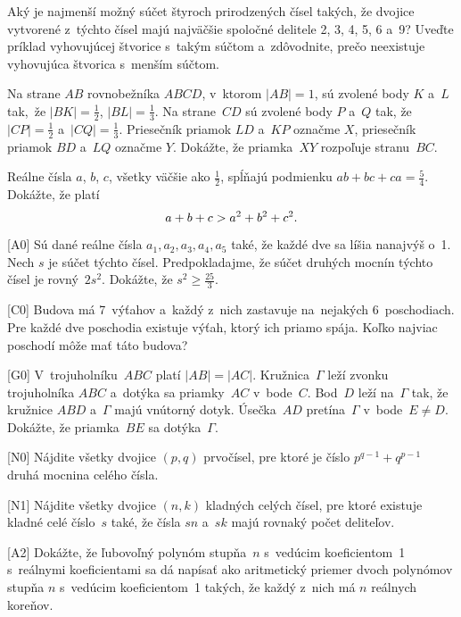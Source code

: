 {%
Aký je najmenší možný súčet štyroch prirodzených čísel takých, že
dvojice vytvorené z~týchto čísel majú najväčšie
spoločné delitele 2, 3, 4, 5, 6 a~9?
Uveďte príklad vyhovujúcej štvorice s~takým súčtom a~zdôvodnite, prečo
neexistuje vyhovujúca štvorica s~menším súčtom.}

{%
Na strane $AB$ rovnobežníka $ABCD$, v~ktorom $|AB|=1$, sú
zvolené body $K$ a~$L$ tak,~že $|BK|=\frac12$,
$|BL|=\frac13$. Na strane~$CD$ sú
zvolené body $P$ a~$Q$ tak, že ${|CP|=\frac12}$ a~$|CQ|=\frac13$.
Priesečník priamok $LD$ a~$KP$ označme $X$, priesečník
priamok $BD$ a~$LQ$ označme $Y$.
Dokážte, že priamka~$XY$ rozpoľuje stranu~$BC$.}

{%
Reálne čísla $a$, $b$, $c$, všetky väčšie ako $\frac12$, spĺňajú
podmienku $ab+bc+ca=\frac54$. Dokážte, že platí
$$
\belowdisplayshortskip0pt
a+b+c>a^2+b^2+c^2.
$$}

{%
[A0] Sú dané reálne čísla $a_1,a_2,a_3,a_4,a_5$ také, že každé dve sa líšia nanajvýš o~1. Nech $s$ je súčet týchto čísel. Predpokladajme, že súčet druhých mocnín týchto čísel je rovný~$2s^2$. Dokážte, že $s^2 \ge \frac{25}{3}$.
}

{%
[C0] Budova má 7~výťahov a~každý z~nich zastavuje na~nejakých 6~poschodiach. Pre každé dve poschodia existuje výťah, ktorý ich priamo spája. Koľko najviac poschodí môže mať táto budova?
}

{%
[G0] V~trojuholníku~$ABC$ platí $|AB|=|AC|$. Kružnica~$\Gamma$ leží zvonku trojuholníka $ABC$ a~dotýka sa priamky~$AC$ v~bode~$C$. Bod~$D$ leží na~$\Gamma$ tak, že kružnice $ABD$ a~$\Gamma$ majú vnútorný dotyk. Úsečka~$AD$ pretína~$\Gamma$ v~bode~$E \ne D$. Dokážte, že priamka~$BE$ sa dotýka~$\Gamma$.}

{%
[N0] Nájdite všetky dvojice $(p,q)$ prvočísel, pre ktoré je číslo $p^{q-1}+q^{p-1}$ druhá mocnina celého čísla.
}

{%
[N1] Nájdite všetky dvojice $(n,k)$ kladných celých čísel, pre ktoré existuje kladné celé číslo~$s$ také, že čísla $sn$ a~$sk$ majú rovnaký počet deliteľov.
}

{%
[A2] Dokážte, že ľubovoľný polynóm stupňa~$n$ s~vedúcim koeficientom~1 s~reálnymi koeficientami sa dá napísať ako aritmetický priemer dvoch polynómov stupňa $n$ s~vedúcim koeficientom~1 takých, že každý z~nich má $n$ reálnych koreňov.
~}

